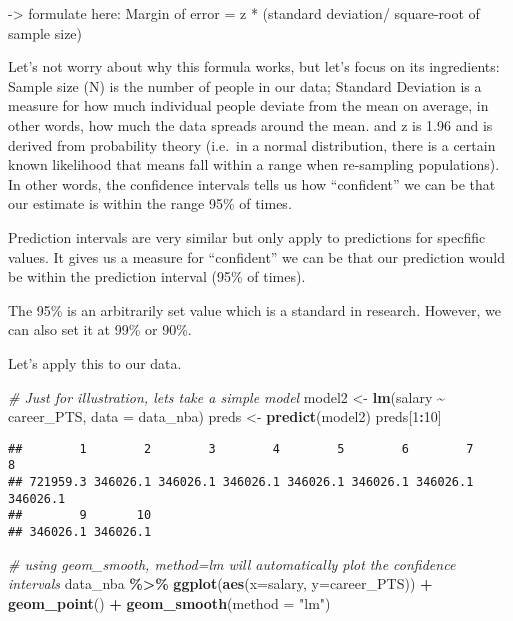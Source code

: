 \documentclass[
]{book}
\newenvironment{Shaded}{\begin{snugshade}}{\end{snugshade}}
\newcommand{\AttributeTok}[1]{\textcolor[rgb]{0.13,0.29,0.53}{#1}}
\newcommand{\CommentTok}[1]{\textcolor[rgb]{0.56,0.35,0.01}{\textit{#1}}}
\newcommand{\DecValTok}[1]{\textcolor[rgb]{0.00,0.00,0.81}{#1}}
\newcommand{\FunctionTok}[1]{\textcolor[rgb]{0.13,0.29,0.53}{\textbf{#1}}}
\newcommand{\NormalTok}[1]{#1}
\newcommand{\OtherTok}[1]{\textcolor[rgb]{0.56,0.35,0.01}{#1}}
\newcommand{\SpecialCharTok}[1]{\textcolor[rgb]{0.81,0.36,0.00}{\textbf{#1}}}
\newcommand{\StringTok}[1]{\textcolor[rgb]{0.31,0.60,0.02}{#1}}
\begin{document}
-\textgreater{} formulate here: Margin of error = z * (standard deviation/ square-root of sample size)

Let's not worry about why this formula works, but let's focus on its ingredients: Sample size (N) is the number of people in our data; Standard Deviation is a measure for how much individual people deviate from the mean on average, in other words, how much the data spreads around the mean. and z is 1.96 and is derived from probability theory (i.e.~in a normal distribution, there is a certain known likelihood that means fall within a range when re-sampling populations). In other words, the confidence intervals tells us how ``confident'' we can be that our estimate is within the range 95\% of times.

Prediction intervals are very similar but only apply to predictions for specfific values. It gives us a measure for ``confident'' we can be that our prediction would be within the prediction interval (95\% of times).

The 95\% is an arbitrarily set value which is a standard in research. However, we can also set it at 99\% or 90\%.

Let's apply this to our data.

\begin{Shaded}
\begin{Highlighting}[]
\CommentTok{\# Just for illustration, let\textquotesingle{}s take a simple model}
\NormalTok{model2 }\OtherTok{\textless{}{-}} \FunctionTok{lm}\NormalTok{(salary }\SpecialCharTok{\textasciitilde{}}\NormalTok{ career\_PTS, }\AttributeTok{data =}\NormalTok{ data\_nba)}
\NormalTok{preds }\OtherTok{\textless{}{-}} \FunctionTok{predict}\NormalTok{(model2)}
\NormalTok{preds[}\DecValTok{1}\SpecialCharTok{:}\DecValTok{10}\NormalTok{]}
\end{Highlighting}
\end{Shaded}

\begin{verbatim}
##        1        2        3        4        5        6        7        8 
## 721959.3 346026.1 346026.1 346026.1 346026.1 346026.1 346026.1 346026.1 
##        9       10 
## 346026.1 346026.1
\end{verbatim}

\begin{Shaded}
\begin{Highlighting}[]
\CommentTok{\# using geom\_smooth, method=lm will automatically plot the confidence intervals}
\NormalTok{data\_nba }\SpecialCharTok{\%\textgreater{}\%}
  \FunctionTok{ggplot}\NormalTok{(}\FunctionTok{aes}\NormalTok{(}\AttributeTok{x=}\NormalTok{salary, }\AttributeTok{y=}\NormalTok{career\_PTS)) }\SpecialCharTok{+}
  \FunctionTok{geom\_point}\NormalTok{() }\SpecialCharTok{+}
  \FunctionTok{geom\_smooth}\NormalTok{(}\AttributeTok{method =} \StringTok{"lm"}\NormalTok{)}
\end{Highlighting}
\end{Shaded}
\end{document}
